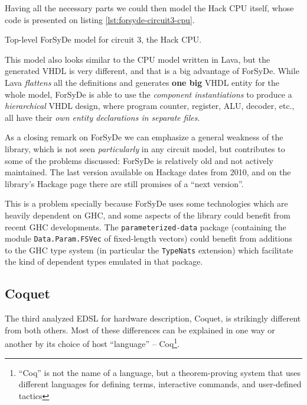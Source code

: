 \documentclass[a4paper]{article}
\begin{document}
                Having all the necessary parts we could then model the Hack CPU itself, whose code
                is presented on listing \ref{lst:forsyde-circuit3-cpu}.

                \begin{listing}[h!]
                    \caption{Top-level ForSyDe model for circuit 3, the Hack CPU.
                        \label{lst:forsyde-circuit3-cpu}}
                \end{listing}

                This model also looks similar to the CPU model written in Lava, but the generated
                VHDL is very different, and that is a big advantage of ForSyDe. While Lava
                \emph{flattens} all the definitions and generates \textbf{one big} VHDL entity for
                the whole model, ForSyDe is able to use the \emph{component instantiations} to
                produce a \emph{hierarchical} VHDL design, where program counter, register, ALU,
                decoder, etc., all have their \emph{own entity declarations in separate files}.

                As a closing remark on ForSyDe we can emphasize a general weakness of the library,
                which is not seen \emph{particularly} in any circuit model, but contributes to
                some of the problems discussed: ForSyDe is relatively old and not actively
                maintained. The last version available on Hackage\cite{forsyde-3.1.1-hackage} dates
                from 2010, and on the library's Hackage page there are still promises of a ``next
                version''.

                This is a problem specially because ForSyDe uses some technologies which are heavily
                dependent on GHC, and some aspects of the library could benefit from recent GHC
                developments. The \texttt{parameterized-data} package (containing the module
                \texttt{Data.Param.FSVec} of fixed-length vectors) could benefit from additions to
                the GHC type system (in particular the \texttt{TypeNats}\cite{website:ghc-typenats}
                extension) which facilitate the kind of dependent types emulated in that package.


        \subsection{Coquet}
        \label{subsec:coquet}
            The third analyzed EDSL for hardware description, Coquet\cite{coquet2011},
            is strikingly different from both others. Most of these differences can be explained in
            one way or another by its choice of host ``language'' -- Coq\footnote{``Coq'' is not
                the name of a language, but a theorem-proving system that uses different languages
                for defining terms, interactive commands, and user-defined tactics}.
\end{document}
